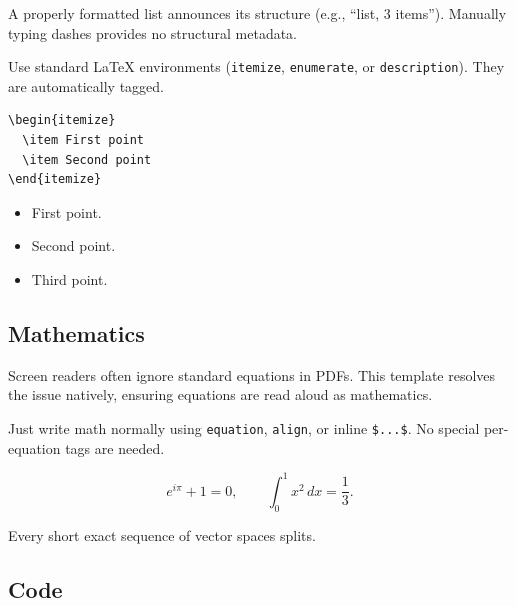  A properly formatted list announces its structure (e.g., \enquote{list, 3 items}). Manually typing dashes provides no structural metadata.

 Use standard LaTeX environments (\texttt{itemize}, \texttt{enumerate}, or \texttt{description}). They are automatically tagged.

\begin{Verbatim}
\begin{itemize}
  \item First point
  \item Second point
\end{itemize}
\end{Verbatim}

\begin{itemize}
  \item First point.
  \item Second point.
  \item Third point.
\end{itemize}

\subsection{Mathematics}
\label{subsec:math}

 Screen readers often ignore standard equations in PDFs. This template resolves the issue natively, ensuring equations are read aloud as mathematics.

 Just write math normally using \texttt{equation}, \texttt{align}, or inline \verb|$...$|. No special per-equation tags are needed.

\begin{equation}
  \label{eq:euler}
  e^{i\pi} + 1 = 0, \qquad \int_{0}^{1} x^{2}\,dx = \frac{1}{3}.
\end{equation}

\begin{theorem}[Splitting]
  \label{thm:split}
  Every short exact sequence of vector spaces splits.
\end{theorem}

\subsection{Code}
\label{subsec:code}

